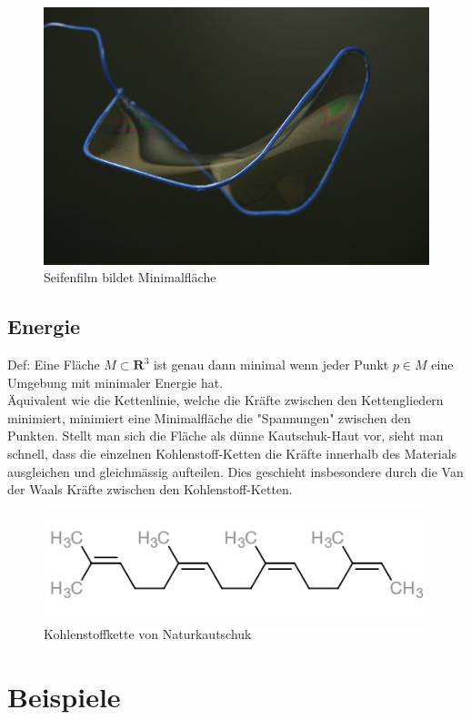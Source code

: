 \begin{figure}[H]
  \centering
  \includegraphics[scale=0.6]{SoapFilm.jpg}
  \caption{Seifenfilm bildet Minimalfläche} 
\end{figure}

\subsection{Energie}
Def: Eine Fläche $M \subset \mathbf{R}^{3}$ ist genau dann minimal wenn jeder Punkt $p \in M$ eine Umgebung mit minimaler Energie hat.\\
Äquivalent wie die Kettenlinie, welche die Kräfte zwischen den Kettengliedern minimiert, minimiert eine Minimalfläche die "Spannungen" zwischen den Punkten. Stellt man sich die Fläche als dünne Kautschuk-Haut vor, sieht man schnell, dass die einzelnen Kohlenstoff-Ketten die Kräfte innerhalb des Materials ausgleichen und gleichmässig aufteilen. Dies geschieht insbesondere durch die Van der Waals Kräfte zwischen den Kohlenstoff-Ketten.

\begin{figure}[H]
  \centering
  \includegraphics[scale=1]{cis-Polyisopren.PNG}
  \caption{Kohlenstoffkette von Naturkautschuk} 
\end{figure}


\section{Beispiele}
